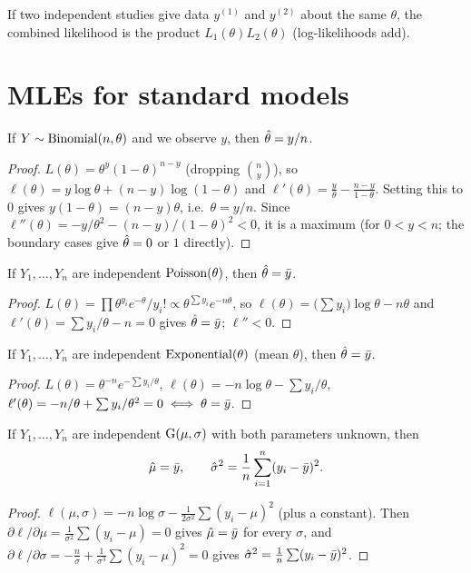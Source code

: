 \begin{remark}
If two independent studies give data $y^{(1)}$ and $y^{(2)}$ about the same $\theta$, the
combined likelihood is the product $L_1(\theta)L_2(\theta)$ (log-likelihoods add).
\end{remark}

\section{MLEs for standard models}

\begin{theorem}[Binomial]
If $Y\sim\operatorname{Binomial}(n,\theta)$ and we observe $y$, then $\hat{\theta} = y/n$.
\end{theorem}
\begin{proof}
$L(\theta) = \theta^y(1-\theta)^{n-y}$ (dropping $\binom ny$), so
$\ell(\theta) = y\log\theta + (n-y)\log(1-\theta)$ and
$\ell'(\theta) = \frac{y}{\theta} - \frac{n-y}{1-\theta}$. Setting this to $0$ gives
$y(1-\theta) = (n-y)\theta$, i.e.\ $\theta = y/n$. Since
$\ell''(\theta) = -y/\theta^2 - (n-y)/(1-\theta)^2 < 0$, it is a maximum (for $0<y<n$;
the boundary cases give $\hat{\theta}=0$ or $1$ directly).
\end{proof}

\begin{theorem}[Poisson]
If $Y_1,\dots,Y_n$ are independent $\operatorname{Poisson}(\theta)$, then $\hat{\theta} = \bar{y}$.
\end{theorem}
\begin{proof}
$L(\theta) = \prod \theta^{y_i}e^{-\theta}/y_i! \propto \theta^{\sum y_i} e^{-n\theta}$, so
$\ell(\theta) = \big(\sum y_i\big)\log\theta - n\theta$ and
$\ell'(\theta) = \sum y_i/\theta - n = 0$ gives $\hat{\theta} = \bar{y}$; $\ell''<0$.
\end{proof}

\begin{theorem}[Exponential]
If $Y_1,\dots,Y_n$ are independent $\operatorname{Exponential}(\theta)$ (mean $\theta$), then $\hat{\theta}=\bar{y}$.
\end{theorem}
\begin{proof}
$L(\theta) = \theta^{-n}e^{-\sum y_i/\theta}$, $\ell(\theta) = -n\log\theta - \sum
y_i/\theta$, $\ell'(\theta) = -n/\theta + \sum y_i/\theta^2 = 0 \iff \theta = \bar{y}$.
\end{proof}

\begin{theorem}[Gaussian]
If $Y_1,\dots,Y_n$ are independent $\operatorname{G}(\mu,\sigma)$ with both parameters unknown, then
\[
\hat\mu = \bar{y}, \qquad \hat\sigma^2 = \frac1n\sum_{i=1}^n (y_i-\bar{y})^2.
\]
\end{theorem}
\begin{proof}
$\ell(\mu,\sigma) = -n\log\sigma - \frac{1}{2\sigma^2}\sum (y_i-\mu)^2$ (plus a
constant). Then
$\partial\ell/\partial\mu = \frac{1}{\sigma^2}\sum(y_i-\mu) = 0$ gives $\hat\mu=\bar{y}$ for
every $\sigma$, and
$\partial\ell/\partial\sigma = -\frac n\sigma + \frac{1}{\sigma^3}\sum(y_i-\mu)^2 = 0$
gives $\hat\sigma^2 = \frac1n\sum(y_i-\bar{y})^2$.
\end{proof}

